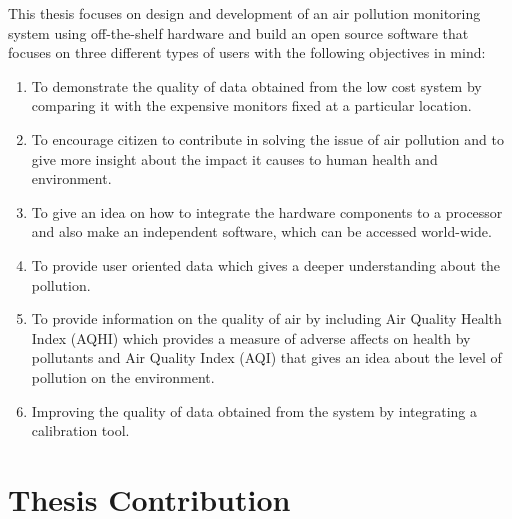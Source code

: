 This thesis focuses on design and development of an air pollution monitoring system using off-the-shelf
hardware and build an open source software that focuses on three different types of users with the following objectives in mind:
\begin{enumerate}
  \item To demonstrate the quality of data obtained from the low cost system by comparing it with the expensive monitors fixed at a particular location.
  
  \item To encourage citizen to contribute in solving the issue of air pollution and to give more insight about the impact it causes to human health and environment.
   
  \item To give an idea on how to integrate the hardware components to a processor and also make an independent software, which can be accessed world-wide.
  
  \item To provide user oriented data which gives a deeper understanding about the pollution.
  
  \item To provide information on the quality of air by including Air Quality Health Index (AQHI) which provides a measure of adverse affects on health by pollutants and Air Quality Index (AQI) that gives an idea about the level of pollution on the environment.

  
  \item Improving the quality of data obtained from the system by integrating a calibration tool.
  

   

\end{enumerate}


\section{Thesis Contribution}

